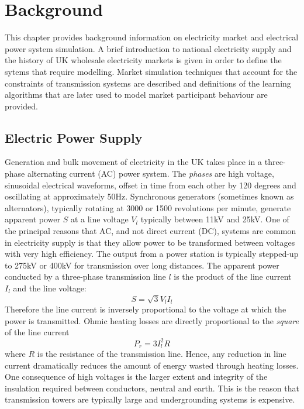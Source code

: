 \chapter{Background}
\label{ch:background}
This chapter provides background information on electricity market and
electrical power system simulation. A brief introduction to national electricity
supply and the history of UK wholesale electricity markets is given in order to
define the sytems that require modelling. Market simulation techniques that
account for the constraints of transmission systems are described and
definitions of the learning algorithms that are later used to model
market participant behaviour are provided.

\section{Electric Power Supply}


Generation and bulk movement of electricity in the UK takes place in a
three-phase alternating current (AC) power system.  The \textit{phases} are high
voltage, sinusoidal electrical waveforms, offset in time from each other by 120
degrees and oscillating at approximately 50Hz. Synchronous generators (sometimes
known as alternators), typically rotating at 3000 or 1500 revolutions per
minute, generate apparent power $S$ at a line voltage $V_l$ typically between
11kV and 25kV.  One of the principal reasons that AC, and not direct current
(DC), systems are common in electricity supply is that they allow power to be
transformed between voltages with very high efficiency. The output from a power
station is typically stepped-up to 275kV or 400kV for transmission over long
distances. The apparent power conducted by a three-phase transmission line $l$
is the product of the line current $I_l$ and the line voltage:
\begin{equation}
S = \sqrt{3} V_l I_l
\end{equation}
Therefore the line current is inversely proportional to the voltage at which
the power is transmitted. Ohmic heating losses are directly proportional to the
\textit{square} of the line current
\begin{equation}
P_{r} = 3 I_l^2 R
\end{equation}
where $R$ is the resistance of the transmission line.  Hence, any reduction in
line current dramatically reduces the amount of energy wasted through heating
losses.  One consequence of high voltages is the larger extent and integrity
of the insulation required between conductors, neutral and earth.  This is the
reason that transmission towers are typically large and undergrounding systems
is expensive.


